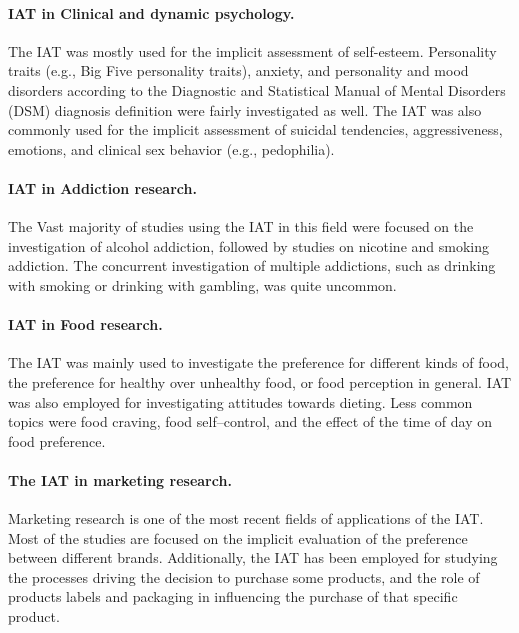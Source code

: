 \documentclass[12pt]{book}
\begin{document}
\paragraph{IAT in Clinical and dynamic psychology.} The IAT was mostly used for the implicit assessment of self-esteem. Personality traits (e.g., Big Five personality traits), anxiety, and personality and mood disorders according to the Diagnostic and Statistical Manual of Mental Disorders (DSM) diagnosis definition were fairly investigated as well. 
The IAT was also commonly used for the implicit assessment of suicidal tendencies, aggressiveness, emotions, and clinical sex behavior (e.g., pedophilia). 

\paragraph{IAT in Addiction research.} The Vast majority of studies using the IAT in this field were focused on the investigation of alcohol addiction, followed by studies on nicotine and smoking addiction. The concurrent investigation of multiple addictions, such as drinking with smoking or drinking with gambling, was quite uncommon. 

\paragraph{IAT in Food research.} The IAT was mainly used to investigate the preference for different kinds of food, the preference for healthy over unhealthy food, or food perception in general. IAT was also employed for investigating attitudes towards dieting. Less common topics were food craving, food self--control, and the effect of the time of day on food preference. 

\paragraph{The IAT in marketing research.} Marketing research is one of the most recent fields of applications of the IAT. Most of the studies are focused on the implicit evaluation of the preference between different brands. Additionally, the IAT has been employed for studying the processes driving the decision to purchase some products, and the role of products labels and packaging in influencing the purchase of that specific product.
\end{document}
